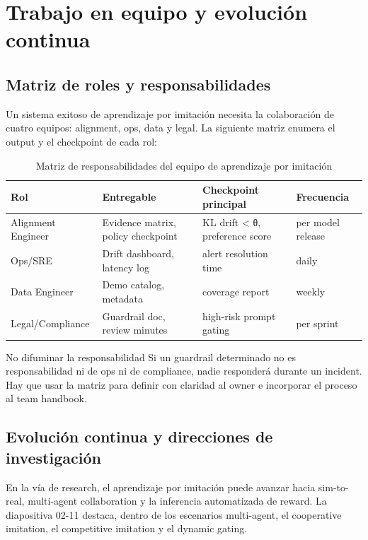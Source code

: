 \section{Trabajo en equipo y evolución continua}

\subsection{Matriz de roles y responsabilidades}

Un sistema exitoso de aprendizaje por imitación necesita la colaboración de cuatro equipos: alignment, ops, data y legal. La siguiente matriz enumera el output y el checkpoint de cada rol:

\begin{table}[H]
\centering
\begin{tabular}{p{} p{} p{} p{}}
\toprule
Rol & Entregable & Checkpoint principal & Frecuencia \\
\midrule
Alignment Engineer & Evidence matrix, policy checkpoint & KL drift < θ, preference score & per model release \\
Ops/SRE & Drift dashboard, latency log & alert resolution time & daily \\
Data Engineer & Demo catalog, metadata & coverage report & weekly \\
Legal/Compliance & Guardrail doc, review minutes & high-risk prompt gating & per sprint \\
\bottomrule
\end{tabular}
\caption{Matriz de responsabilidades del equipo de aprendizaje por imitación}
\end{table}

\begin{warningbox}{No difuminar la responsabilidad}
Si un guardrail determinado no es responsabilidad ni de ops ni de compliance, nadie responderá durante un incident. Hay que usar la matriz para definir con claridad al owner e incorporar el proceso al team handbook.
\end{warningbox}

\subsection{Evolución continua y direcciones de investigación}

En la vía de research, el aprendizaje por imitación puede avanzar hacia sim-to-real, multi-agent collaboration y la inferencia automatizada de reward. La diapositiva 02-11 destaca, dentro de los escenarios multi-agent, el cooperative imitation, el competitive imitation y el dynamic gating.

